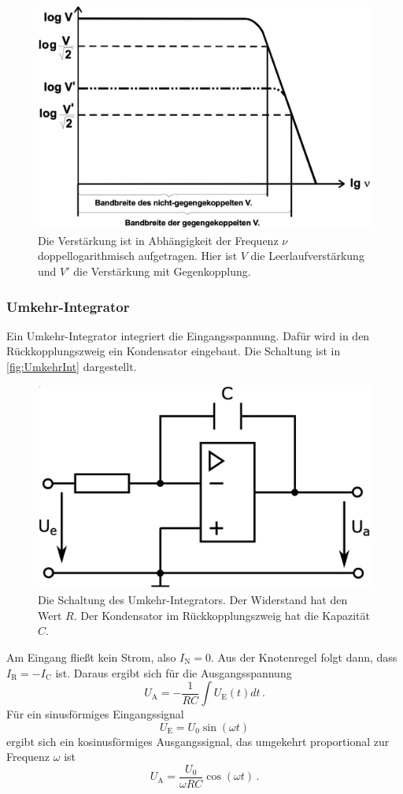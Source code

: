 \begin{figure}
    \centering
    \includegraphics[width=0.7\linewidth]{./figures/Bandbreite.png}
    \caption{Die Verstärkung ist in Abhängigkeit der Frequenz $\nu$ doppellogarithmisch aufgetragen. Hier ist $V$ die Leerlaufverstärkung und $V'$ die Verstärkung mit Gegenkopplung. \cite{V51old}}
\end{figure}


\subsubsection{Umkehr-Integrator}
Ein Umkehr-Integrator integriert die Eingangsspannung.
Dafür wird in den Rückkopplungszweig ein Kondensator eingebaut. Die Schaltung ist in \autoref{fig:UmkehrInt} dargestellt.

\begin{figure}
    \centering
    \includegraphics[width=0.7\linewidth]{./figures/2_Umkehr.png}
    \caption{Die Schaltung des Umkehr-Integrators. Der Widerstand hat den Wert $R$. Der Kondensator im Rückkopplungszweig hat die Kapazität $C$. \cite{V51}}
    \label{fig:UmkehrInt}
\end{figure}

Am Eingang fließt kein Strom, also $I_\text{N} = 0$. Aus der Knotenregel folgt dann, dass $I_\text{R} = - I_\text{C}$ ist. Daraus ergibt sich für die Ausgangsspannung
\begin{equation*}
    U_\text{A} = - \frac{1}{R C} \int U_\text{E}(t) dt \, .
    \label{eq:Integrator}
\end{equation*}
Für ein sinusförmiges Eingangssignal
\begin{equation}
    U_\text{E} = U_0 \sin(\omega t)
    \label{eq:Sinus}
\end{equation}
ergibt sich ein kosinusförmiges Ausgangssignal, das umgekehrt proportional zur Frequenz $\omega$ ist
\begin{equation}
    U_\text{A} = \frac{U_0}{\omega R C} \cos(\omega t) \, .
    \label{eq:Int_Kosinus}
\end{equation}


